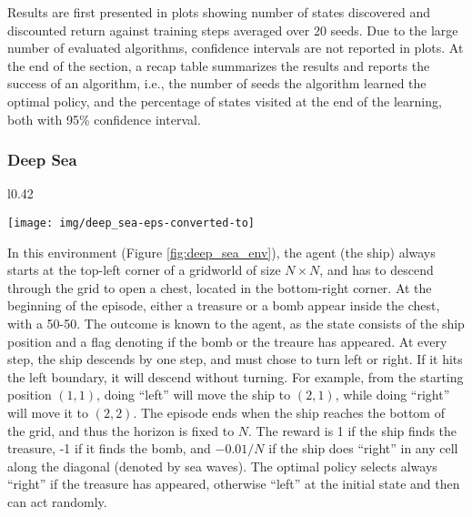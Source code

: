 \documentclass{article}
\begin{document}
Results are first presented in plots showing number of states discovered and discounted return against training steps averaged over 20 seeds. 
Due to the large number of evaluated algorithms, confidence intervals are not reported in plots. At the end of the section, a recap table summarizes the results and reports the success of an algorithm, i.e., the number of seeds the algorithm learned the optimal policy, and the percentage of states visited at the end of the learning, both with 95\% confidence interval.



\subsubsection{Deep Sea}
\label{sssec:deep_sea}
\begin{wrapfigure}{l}{0.42\textwidth}
	\begin{center}
		\vspace*{-0.7cm}
		\texttt{[image: img/deep\_sea-eps-converted-to]}
	\end{center}
	\vspace*{-0.3cm}
	\caption{\label{fig:deep_sea_env}The deep sea.}
	\vspace*{-0.3cm}
\end{wrapfigure}
In this environment (Figure \ref{fig:deep_sea_env}), the agent (the ship) always starts at the top-left corner of a gridworld of size $N \times N$, and has to descend through the grid to open a chest, located in the bottom-right corner. At the beginning of the episode, either a treasure or a bomb appear inside the chest, with a 50-50. The outcome is known to the agent, as the state consists of the ship position and a flag denoting if the bomb or the treaure has appeared. At every step, the ship descends by one step, and must chose to turn left or right. If it hits the left boundary, it will descend without turning. For example, from the starting position $(1,1)$, doing ``left'' will move the ship to $(2,1)$, while doing ``right'' will move it to $(2,2)$. The episode ends when the ship reaches the bottom of the grid, and thus the horizon is fixed to $N$.
The reward is 1 if the ship finds the treasure, -1 if it finds the bomb, and $-0.01/N$ if the ship does ``right'' in any cell along the diagonal (denoted by sea waves). 
The optimal policy selects always ``right'' if the treasure has appeared, otherwise ``left'' at the initial state and then can act randomly.
\end{document}
